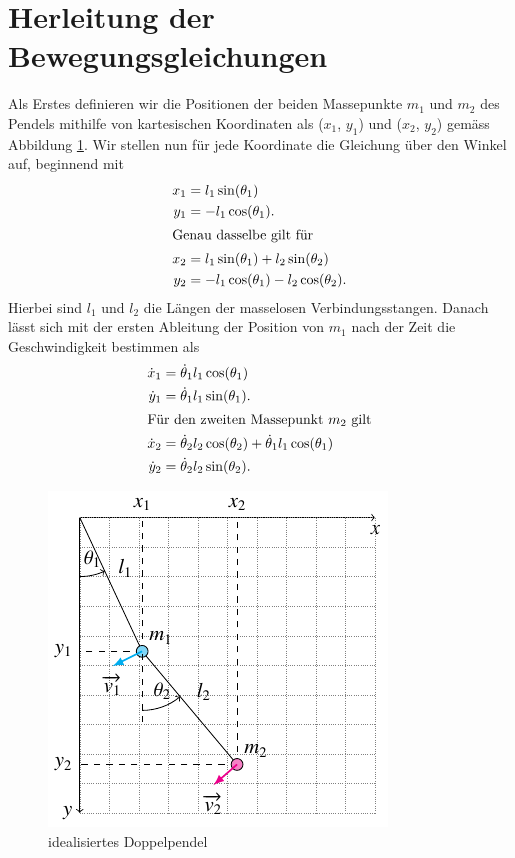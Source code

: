 
\section{Herleitung der Bewegungsgleichungen}
Als Erstes definieren wir die Positionen der beiden Massepunkte 
\(m_1\) und \(m_2\) des Pendels mithilfe von kartesischen Koordinaten 
als (\(x_1\), \(y_1\)) und (\(x_2\), \(y_2\)) gemäss Abbildung \ref{fig:pendulum}.
Wir stellen nun für jede Koordinate die Gleichung über den Winkel auf,
beginnend mit
\begin{align*}
    x_1 &= l_1 \sin(\theta_1)\\
    y_1 &= -l_1 \cos(\theta_1).\\
    \shortintertext{Genau dasselbe gilt für}
    x_2 &= l_1 \sin(\theta_1) + l_2 \sin(\theta_2)\\
    y_2 &= -l_1 \cos(\theta_1) - l_2 \cos(\theta_2).  
\end{align*}
Hierbei sind \(l_1\) und \(l_2\) die Längen der masselosen Verbindungsstangen.
Danach lässt sich mit der ersten Ableitung der Position von
\(m_1\) nach der Zeit die Geschwindigkeit bestimmen als
\begin{align*}
    \dot{x}_1 &= \dot{\theta}_1 l_1 \cos(\theta_1)\\
    \dot{y}_1 &= \dot{\theta}_1 l_1 \sin(\theta_1).\\ 
    \shortintertext{Für den zweiten Massepunkt \(m_2\) gilt}
    \dot{x}_2 &= \dot{\theta}_2 l_2 \cos(\theta_2)
    + \dot{\theta}_1 l_1 \cos(\theta_1)\\
    \dot{y}_2 &= \dot{\theta}_2 l_2 \sin(\theta_2).
\end{align*}

\begin{figure}
    \centering
    \includegraphics{papers/doppelpendel/images/pendel_pic.pdf}
    \caption{idealisiertes Doppelpendel}
    \label{fig:pendulum}
\end{figure}


